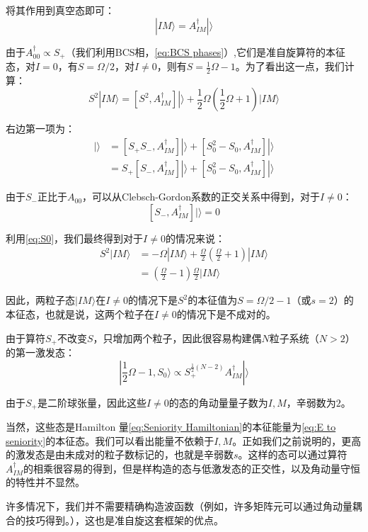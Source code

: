 将其作用到真空态即可：
\begin{equation}
|IM\rangle=A^{\dagger}_{IM}|\rangle\label{eq:|IM>}
\end{equation}

由于$A^{\dagger}_{00}\propto S_{+}$（我们利用BCS相，\ref{eq:BCS phases}）,它们是准自旋算符的本征态，对$I=0$，有$S=\Omega/2$，对$I\neq0$，则有$S=\frac{1}{2}\Omega-1$。为了看出这一点，我们计算：
\[
S^{2}|IM\rangle=[S^{2},A^{\dagger}_{IM}]|\rangle+\frac{1}{2}\Omega\left(\frac{1}{2}\Omega+1\right)|IM\rangle
\]

右边第一项为：
\begin{align*}
[S^{2},A^{\dagger}_{IM}]|\rangle & =[S_{+}S_{-},A^{\dagger}_{IM}]|\rangle+[S^{2}_{0}-S_{0},A^{\dagger}_{IM}]|\rangle\\
 & =S_{+}[S_{-},A^{\dagger}_{IM}]|\rangle+[S^{2}_{0}-S_{0},A^{\dagger}_{IM}]|\rangle
\end{align*}

由于$S_{-}$正比于$A_{00}$，可以从Clebsch-Gordon系数的正交关系\cite{Ed57}中得到，对于$I\neq0$：
\[
[S_{-},A^{\dagger}_{IM}]|\rangle=0
\]

利用\ref{eq:S0}，我们最终得到对于$I\neq0$的情况来说：
\begin{align*}
S^{2}|IM\rangle & =-\Omega|IM\rangle+\frac{\Omega}{2}\left(\frac{\Omega}{2}+1\right)|IM\rangle\\
 & =\left(\frac{\Omega}{2}-1\right)\frac{\Omega}{2}|IM\rangle
\end{align*}

因此，两粒子态$|IM\rangle$在$I\neq0$的情况下是$S^{2}$的本征值为$S=\Omega/2-1$（或$s=2$）的本征态，也就是说，这两个粒子在$I\neq0$的情况下是不成对的。

由于算符$S_{+}$不改变$S$，只增加两个粒子，因此很容易构建偶$N$粒子系统（$N>2$）的第一激发态：
\[
|\frac{1}{2}\Omega-1,S_{0}\rangle\propto S^{\frac{1}{2}(N-2)}_{+}A^{\dagger}_{IM}|\rangle
\]

由于$S_{+}$是二阶球张量，因此这些$I\neq0$的态的角动量量子数为$I,M$，辛弱数为$2\text{。}$

当然，这些态是Hamilton 量\ref{eq:Seniority Hamiltonian}的本征能量为\ref{eq:E to seniority}的本征态。我们可以看出能量不依赖于$I,M$。正如我们之前说明的，更高的激发态是由未成对的粒子数标记的，也就是辛弱数$s$。这样的态可以通过算符$A^{\dagger}_{IM}$的相乘很容易的得到，但是样构造的态与低激发态的正交性，以及角动量守恒的特性并不显然。

许多情况下，我们并不需要精确构造波函数（例如，许多矩阵元可以通过角动量耦合的技巧得到。），这也是准自旋这套框架的优点。

